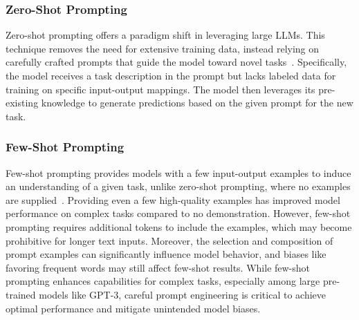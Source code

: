 \documentclass{article}
\begin{document}
\subsubsection{Zero-Shot Prompting} 
\label{zero}
Zero-shot prompting offers a paradigm shift in leveraging large LLMs. This technique removes the need for extensive training data, instead relying on carefully crafted prompts that guide the model toward novel tasks~\citep{radford2019language}. Specifically, the model receives a task description in the prompt but lacks labeled data for training on specific input-output mappings. The model then leverages its pre-existing knowledge to generate predictions based on the given prompt for the new task.



\subsubsection{Few-Shot Prompting}
\label{few}
Few-shot prompting provides models with a few input-output examples to induce an understanding of a given task, unlike zero-shot prompting, where no examples are supplied~\citep{brown2020language}. Providing even a few high-quality examples has improved model performance on complex tasks compared to no demonstration. However, few-shot prompting requires additional tokens to include the examples, which may become prohibitive for longer text inputs. Moreover, the selection and composition of prompt examples can significantly influence model behavior, and biases like favoring frequent words may still affect few-shot results. While few-shot prompting enhances capabilities for complex tasks, especially among large pre-trained models like GPT-3, careful prompt engineering is critical to achieve optimal performance and mitigate unintended model biases. 
\end{document}
